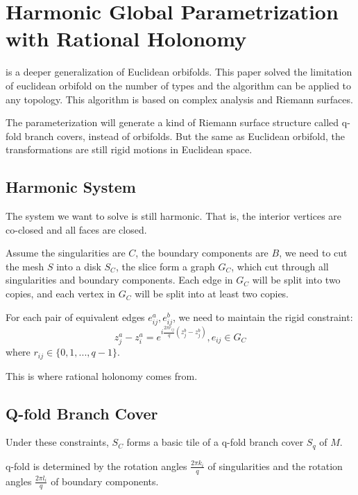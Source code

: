 \documentclass[fleqn,10pt]{wlscirep}
\begin{document}
\section{Harmonic Global Parametrization with Rational Holonomy}

\cite{Bright:2017:HGP:3072959.3073646} is a deeper generalization of Euclidean orbifolds. This paper solved the limitation of euclidean orbifold on the number of types and the algorithm can be applied to any topology.  This algorithm is based on complex analysis and Riemann surfaces. 

The parameterization will generate a kind of Riemann surface structure called q-fold branch covers, instead of orbifolds. But the same as Euclidean orbifold, the transformations are still rigid motions in Euclidean space.

\subsection{Harmonic System}

The system we want to solve is still harmonic. That is, the interior vertices are co-closed and all faces are closed. 

Assume the singularities are $C$, the boundary components are $B$, we need to cut the mesh $S$ into a disk $S_C$, the slice form a graph $G_C$, which cut through all singularities and boundary components.  Each edge in $G_C$ will be split into two copies, and each vertex in $G_C$ will be split into at least two copies. 

For each pair of equivalent edges $e_{ij}^a, e_{ij}^b$, we need to maintain the rigid constraint: 
\begin{equation}
z^a_{j}-z^a_i=e^{i\frac{2\pi r_{ij}}{q} (z^b_j-z^b_j)}, e_{ij}\in G_C
\end{equation}
where $r_{ij} \in \{0,1,...,q-1\}.$

This is where rational holonomy comes from.

\subsection{Q-fold Branch Cover}

Under these constraints, $S_C$ forms a basic tile of a q-fold branch cover $S_q$ of $M$.

q-fold is determined by the rotation angles $\frac{2\pi k_i}{q}$ of singularities and the rotation angles $\frac{2\pi l_i}{q}$ of boundary components.
\end{document}
